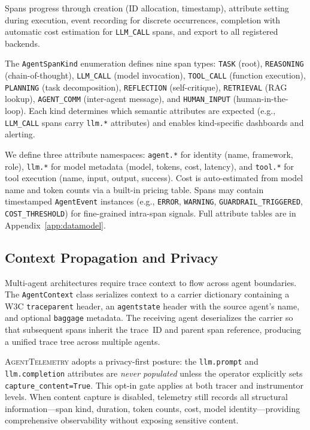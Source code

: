\documentclass[sigplan,10pt,screen]{acmart}
\begin{document}
Spans progress through creation (ID allocation, timestamp), attribute
setting during execution, event recording for discrete occurrences, completion
with automatic cost estimation for \texttt{LLM\_CALL} spans, and export to
all registered backends.

The \texttt{AgentSpanKind} enumeration defines nine span types:
\texttt{TASK} (root), \texttt{REASONING} (chain-of-thought),
\texttt{LLM\_CALL} (model invocation), \texttt{TOOL\_CALL}
(function execution), \texttt{PLANNING} (task decomposition),
\texttt{REFLECTION} (self-critique), \texttt{RETRIEVAL} (RAG lookup),
\texttt{AGENT\_COMM} (inter-agent message), and \texttt{HUMAN\_INPUT}
(human-in-the-loop).  Each kind determines which semantic attributes are
expected (e.g., \texttt{LLM\_CALL} spans carry \texttt{llm.*} attributes)
and enables kind-specific dashboards and alerting.

We define three attribute namespaces: \texttt{agent.*} for identity
(name, framework, role), \texttt{llm.*} for model metadata (model,
tokens, cost, latency), and \texttt{tool.*} for tool execution (name,
input, output, success).  Cost is auto-estimated from model name and
token counts via a built-in pricing table.  Spans may contain timestamped
\texttt{AgentEvent} instances (e.g., \texttt{ERROR}, \texttt{WARNING},
\texttt{GUARDRAIL\_TRIGGERED}, \texttt{COST\_THRESHOLD}) for
fine-grained intra-span signals.  Full attribute tables are in
Appendix~\ref{app:datamodel}.

\subsection{Context Propagation and Privacy}
\label{sec:context}

Multi-agent architectures require trace context to flow across agent
boundaries.  The \texttt{AgentContext} class serializes context to a
carrier dictionary containing a W3C \texttt{traceparent} header, an
\texttt{agentstate} header with the source agent's name, and optional
\texttt{baggage} metadata.  The receiving agent deserializes the carrier
so that subsequent spans inherit the trace~ID and parent span reference,
producing a unified trace tree across multiple agents.

\textsc{AgentTelemetry} adopts a privacy-first posture: the
\texttt{llm.\allowbreak prompt} and \texttt{llm.\allowbreak completion}
attributes are \emph{never populated} unless the operator explicitly
sets \texttt{capture\_content=True}.  This opt-in gate applies at both
tracer and instrumentor levels.  When content capture is disabled,
telemetry still records all structural information---span kind,
duration, token counts, cost, model identity---providing comprehensive
observability without exposing sensitive content.
\end{document}
